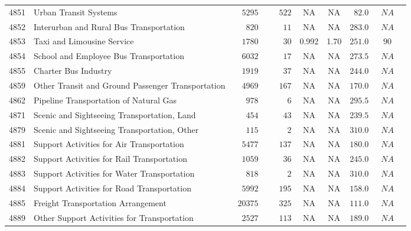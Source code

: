 \documentclass[9pt, oneside]{article}   	%
\begin{document}
\begin{longtable}{lp{3 in}ccccccc}
4851  & Urban Transit Systems & $\phantom{00}5295$ & $\phantom{000}522$ &    NA &    NA & $\phantom{0}82.0$ & $\phantom{0}NA$ \\
4852  & Interurban and Rural Bus Transportation & $\phantom{000}820$ & $\phantom{0000}11$ &    NA &    NA & $283.0$ & $\phantom{0}NA$ \\
4853  & Taxi and Limousine Service & $\phantom{00}1780$ & $\phantom{0000}30$ & 0.992 &  1.70 & $251.0$ & $\phantom{0}90$ \\
4854  & School and Employee Bus Transportation & $\phantom{00}6032$ & $\phantom{0000}17$ &    NA &    NA & $273.5$ & $\phantom{0}NA$ \\
4855  & Charter Bus Industry & $\phantom{00}1919$ & $\phantom{0000}37$ &    NA &    NA & $244.0$ & $\phantom{0}NA$ \\
4859  & Other Transit and Ground Passenger Transportation & $\phantom{00}4969$ & $\phantom{000}167$ &    NA &    NA & $170.0$ & $\phantom{0}NA$ \\
4862  & Pipeline Transportation of Natural Gas & $\phantom{000}978$ & $\phantom{00000}6$ &    NA &    NA & $295.5$ & $\phantom{0}NA$ \\
4871  & Scenic and Sightseeing Transportation, Land & $\phantom{000}454$ & $\phantom{0000}43$ &    NA &    NA & $239.5$ & $\phantom{0}NA$ \\
4879  & Scenic and Sightseeing Transportation, Other & $\phantom{000}115$ & $\phantom{00000}2$ &    NA &    NA & $310.0$ & $\phantom{0}NA$ \\
4881  & Support Activities for Air Transportation & $\phantom{00}5477$ & $\phantom{000}137$ &    NA &    NA & $180.0$ & $\phantom{0}NA$ \\
4882  & Support Activities for Rail Transportation & $\phantom{00}1059$ & $\phantom{0000}36$ &    NA &    NA & $245.0$ & $\phantom{0}NA$ \\
4883  & Support Activities for Water Transportation & $\phantom{000}818$ & $\phantom{00000}2$ &    NA &    NA & $310.0$ & $\phantom{0}NA$ \\
4884  & Support Activities for Road Transportation & $\phantom{00}5992$ & $\phantom{000}195$ &    NA &    NA & $158.0$ & $\phantom{0}NA$ \\
4885  & Freight Transportation Arrangement & $\phantom{0}20375$ & $\phantom{000}325$ &    NA &    NA & $111.0$ & $\phantom{0}NA$ \\
4889  & Other Support Activities for Transportation & $\phantom{00}2527$ & $\phantom{000}113$ &    NA &    NA & $189.0$ & $\phantom{0}NA$ \\

\end{longtable}
\end{document}
